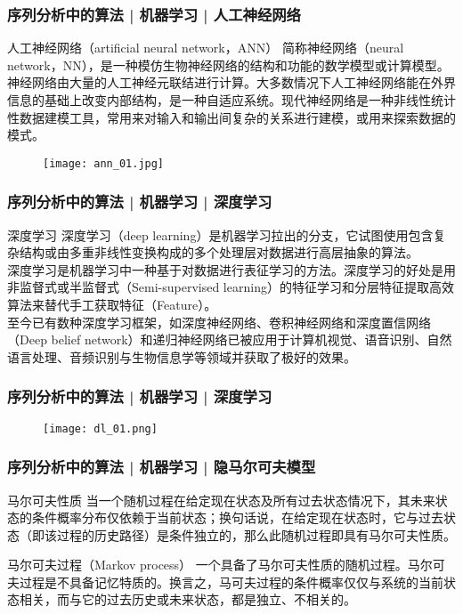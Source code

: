 \begin{frame}
  \frametitle{序列分析中的算法 | 机器学习 | 人工神经网络}
  \begin{block}{人工神经网络（artificial neural network，ANN）}
   简称神经网络（neural network，NN），是一种模仿生物神经网络的结构和功能的数学模型或计算模型。神经网络由大量的人工神经元联结进行计算。大多数情况下人工神经网络能在外界信息的基础上改变内部结构，是一种自适应系统。现代神经网络是一种非线性统计性数据建模工具，常用来对输入和输出间复杂的关系进行建模，或用来探索数据的模式。
  \end{block}
  \begin{figure}
    \centering
    \texttt{[image: ann\_01.jpg]}
  \end{figure}
\end{frame}

\begin{frame}
  \frametitle{序列分析中的算法 | 机器学习 | 深度学习}
  \begin{block}{深度学习}
    深度学习（deep learning）是机器学习拉出的分支，它试图使用包含复杂结构或由多重非线性变换构成的多个处理层对数据进行高层抽象的算法。\\
    \vspace{0.5em}
深度学习是机器学习中一种基于对数据进行表征学习的方法。深度学习的好处是用非监督式或半监督式（Semi-supervised learning）的特征学习和分层特征提取高效算法来替代手工获取特征（Feature）。\\
    \vspace{0.5em}
至今已有数种深度学习框架，如深度神经网络、卷积神经网络和深度置信网络（Deep belief network）和递归神经网络已被应用于计算机视觉、语音识别、自然语言处理、音频识别与生物信息学等领域并获取了极好的效果。
  \end{block}
\end{frame}

\begin{frame}
  \frametitle{序列分析中的算法 | 机器学习 | 深度学习}
  \begin{figure}
    \centering
    \texttt{[image: dl\_01.png]}
  \end{figure}
\end{frame}

\begin{frame}
  \frametitle{序列分析中的算法 | 机器学习 | 隐马尔可夫模型}
  \begin{block}{马尔可夫性质}
    当一个随机过程在给定现在状态及所有过去状态情况下，其未来状态的条件概率分布仅依赖于当前状态；换句话说，在给定现在状态时，它与过去状态（即该过程的历史路径）是条件独立的，那么此随机过程即具有马尔可夫性质。
  \end{block}
  \pause
  \begin{block}{马尔可夫过程（Markov process）}
    一个具备了马尔可夫性质的随机过程。马尔可夫过程是不具备记忆特质的。换言之，马可夫过程的条件概率仅仅与系统的当前状态相关，而与它的过去历史或未来状态，都是独立、不相关的。
  \end{block}
\end{frame}

